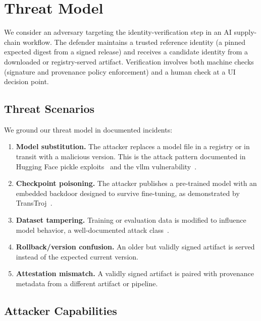 \documentclass[conference,10pt]{IEEEtran}
\begin{document}
\section{Threat Model}
\label{sec:threat}

We consider an adversary targeting the identity-verification step in an AI supply-chain workflow.
The defender maintains a trusted reference identity (a pinned expected digest from a signed release) and receives a candidate identity from a downloaded or registry-served artifact.
Verification involves both machine checks (signature and provenance policy enforcement) and a human check at a UI decision point.

\subsection{Threat Scenarios}

We ground our threat model in documented incidents:

\begin{enumerate}[leftmargin=*,nosep]
  \item \textbf{Model substitution.} The attacker replaces a model file in a registry or in transit with a malicious version. This is the attack pattern documented in Hugging Face pickle exploits~\cite{cso2025pickle,rapid72025pickle} and the vllm vulnerability~\cite{vllm2025cve}.
  \item \textbf{Checkpoint poisoning.} The attacker publishes a pre-trained model with an embedded backdoor designed to survive fine-tuning, as demonstrated by TransTroj~\cite{transtroj2025www}.
  \item \textbf{Dataset tampering.} Training or evaluation data is modified to influence model behavior, a well-documented attack class~\cite{backdoor2025survey}.
  \item \textbf{Rollback/version confusion.} An older but validly signed artifact is served instead of the expected current version.
  \item \textbf{Attestation mismatch.} A validly signed artifact is paired with provenance metadata from a different artifact or pipeline.
\end{enumerate}

\subsection{Attacker Capabilities}
\end{document}
